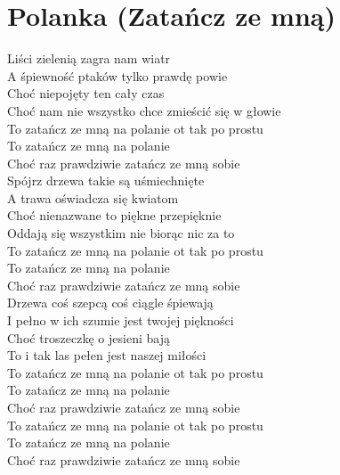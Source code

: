 \section{Polanka (Zatańcz ze mną)}
\begin{text}
Liści zielenią zagra nam wiatr\\
A śpiewność ptaków tylko prawdę powie\\
Choć niepojęty ten cały czas\\
Choć nam nie wszystko chce zmieścić się w głowie\\

To zatańcz ze mną na polanie ot tak po prostu\\
To zatańcz ze mną na polanie\\
Choć raz prawdziwie zatańcz ze mną sobie\\

Spójrz drzewa takie są uśmiechnięte\\
A trawa oświadcza się kwiatom\\
Choć nienazwane to piękne przepięknie\\
Oddają się wszystkim nie biorąc nic za to\\

To zatańcz ze mną na polanie ot tak po prostu\\
To zatańcz ze mną na polanie\\
Choć raz prawdziwie zatańcz ze mną sobie\\

Drzewa coś szepcą coś ciągle śpiewają\\
I pełno w ich szumie jest twojej piękności\\
Choć troszeczkę o jesieni bają\\
To i tak las pełen jest naszej miłości\\

To zatańcz ze mną na polanie ot tak po prostu\\
To zatańcz ze mną na polanie\\
Choć raz prawdziwie zatańcz ze mną sobie\\

To zatańcz ze mną na polanie ot tak po prostu\\
To zatańcz ze mną na polanie\\
Choć raz prawdziwie zatańcz ze mną sobie
\end{text}
